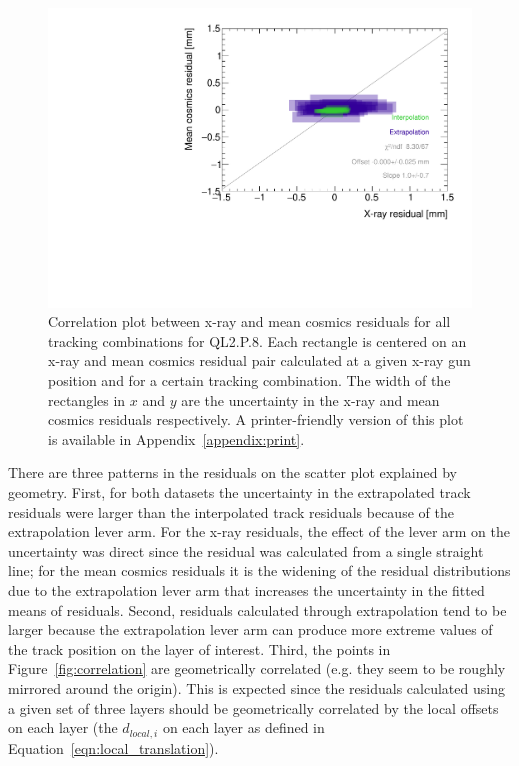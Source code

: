 \begin{figure}
    \centering
    \includegraphics[width = \textwidth]{figures/figure_QL2P08_3100V_2021-08-16_QL2P08_local_cosmic_and_xray_data_correlation_plot.pdf}
    \caption{Correlation plot between x-ray and mean cosmics residuals for all tracking combinations for QL2.P.8. Each rectangle is centered on an x-ray and mean cosmics residual pair calculated at a given x-ray gun position and for a certain tracking combination. The width of the rectangles in $x$ and $y$ are the uncertainty in the x-ray and mean cosmics residuals respectively. A printer-friendly version of this plot is available in Appendix~\ref{appendix:print}.}
    \label{fig:no_correlation}
\end{figure}

There are three patterns in the residuals on the scatter plot explained by geometry. First, for both datasets the uncertainty in the extrapolated track residuals were larger than the interpolated track residuals because of the extrapolation lever arm. For the x-ray residuals, the effect of the lever arm on the uncertainty was direct since the residual was calculated from a single straight line; for the mean cosmics residuals it is the widening of the residual distributions due to the extrapolation lever arm that increases the uncertainty in the fitted means of residuals. Second, residuals calculated through extrapolation tend to be larger because the extrapolation lever arm can produce more extreme values of the track position on the layer of interest. Third, the points in Figure~\ref{fig:correlation} are geometrically correlated (e.g. they seem to be roughly mirrored around the origin). This is expected since the residuals calculated using a given set of three layers should be geometrically correlated by the local offsets on each layer (the $d_{local, i}$ on each layer as defined in Equation~\ref{eqn:local_translation}). 

